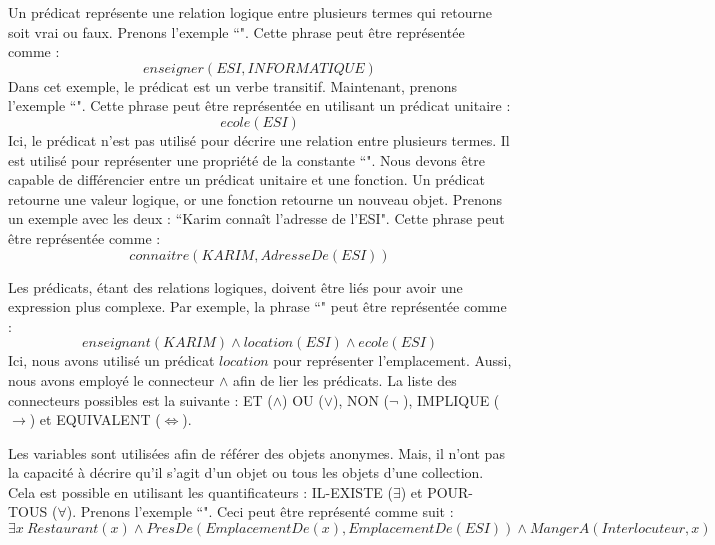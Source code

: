 \documentclass{KodeBook}
\begin{document}
Un prédicat représente une relation logique entre plusieurs termes qui retourne soit vrai ou faux.
Prenons l'exemple ``".
Cette phrase peut être représentée comme : 
\[enseigner(ESI, INFORMATIQUE)\]
Dans cet exemple, le prédicat est un verbe transitif. 
Maintenant, prenons l'exemple ``".
Cette phrase peut être représentée en utilisant un prédicat unitaire :
\[ecole(ESI)\]
Ici, le prédicat n'est pas utilisé pour décrire une relation entre plusieurs termes. 
Il est utilisé pour représenter une propriété de la constante ``". 
Nous devons être capable de différencier entre un prédicat unitaire et une fonction. 
Un prédicat retourne une valeur logique, or une fonction retourne un nouveau objet.
Prenons un exemple avec les deux : ``Karim connaît l'adresse de l'ESI". 
Cette phrase peut être représentée comme : 
\[connaitre(KARIM, AdresseDe(ESI))\]

Les prédicats, étant des relations logiques, doivent être liés pour avoir une expression plus complexe. 
Par exemple, la phrase ``" peut être représentée comme :
\[enseignant(KARIM) \wedge location(ESI) \wedge ecole(ESI)\]
Ici, nous avons utilisé un prédicat $location$ pour représenter l'emplacement. 
Aussi, nous avons employé le connecteur $\wedge$ afin de lier les prédicats. 
La liste des connecteurs possibles est la suivante : ET ($ \wedge $) OU ($ \vee $), NON ($ \neg $ ), IMPLIQUE ($\rightarrow$) et EQUIVALENT ($ \Leftrightarrow $).

Les variables sont utilisées afin de référer des objets anonymes.  
Mais, il n'ont pas la capacité à décrire qu'il s'agit d'un objet ou tous les objets d'une collection. 
Cela est possible en utilisant les quantificateurs : IL-EXISTE ($\exists$) et POUR-TOUS ($\forall$).
Prenons l'exemple ``".
Ceci peut être représenté comme suit : 
\[\exists x\ Restaurant(x) \wedge PresDe(EmplacementDe(x), EmplacementDe(ESI)) \wedge  MangerA(Interlocuteur, x)\]
\end{document}
